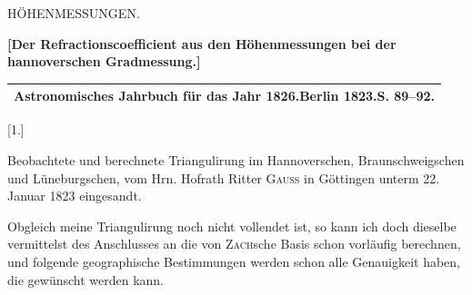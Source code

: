 

\clearpage\null\vspace*{5.7cm}
\begin{center}{\fontsize{24}{30}\selectfont HÖHENMESSUNGEN.}\end{center}
\par\vspace*{11.2cm}\noindent\makebox[.86\linewidth][r]{55\textsuperscript{*}}\par
\clearpage\null
\clearpage
\vspace*{1.5cm}
\begin{center}
{\large\textbf{[Der Refractionscoefficient aus den Höhenmessungen bei der hannoverschen Gradmessung.]}}\par\bigskip
\begin{tabular}{c}\hline
\textbf{Astronomisches Jahrbuch für das Jahr 1826.\quad Berlin 1823.\quad S. 89--92.}\\\hline
\end{tabular}\par\bigskip
{\large [1.]}\par\medskip
{\large Beobachtete und berechnete Triangulirung im Hannoverschen, Braunschweigschen und Lüneburgschen, vom Hrn. Hofrath Ritter \textsc{Gauss} in Göttingen unterm 22. Januar 1823 eingesandt.}
\end{center}
\par\noindent\hspace*{\parindent}Obgleich meine Triangulirung noch nicht vollendet ist, so kann ich doch dieselbe vermittelst des Anschlusses an die von \textsc{Zach}sche Basis schon vorläufig berechnen, und folgende geographische Bestimmungen werden schon alle Genauigkeit haben, die gewünscht werden kann.
